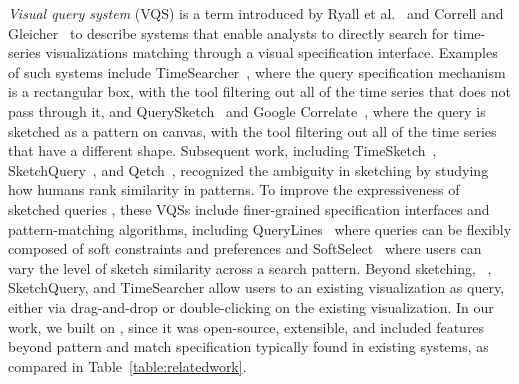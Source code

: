 {  \npar \emph{Visual query system} (VQS) is a term introduced by Ryall et al.~\cite{ryall2005querylines} and Correll and Gleicher~\cite{correll2016semantics} to describe systems that enable analysts to directly search for time-series visualizations matching  through a visual specification interface. Examples of such systems include TimeSearcher~\cite{Hochheiser2001,Hochheiser2004}, where the query specification mechanism is a rectangular box, with the tool filtering out all of the time series that does not pass through it, and QuerySketch~\cite{wattenberg2001sketching} and Google Correlate~\cite{mohebbi2011google}, where the query is sketched as a pattern on canvas, with the tool filtering out all of the time series that have a different shape. Subsequent work, including TimeSketch~\cite{Eichmann2015}, SketchQuery~\cite{correll2016semantics}, and Qetch~\cite{Mannino2018}, recognized the ambiguity in sketching by studying how humans rank similarity in patterns. To improve the expressiveness of sketched queries , these VQSs include finer-grained specification interfaces and pattern-matching algorithms, including QueryLines~\cite{ryall2005querylines} where queries can be flexibly composed of soft constraints and preferences and SoftSelect~\cite{Holz2009} where users can vary the level of sketch similarity across a search pattern. Beyond sketching, \zv~\cite{Siddiqui2017,Siddiqui2017VLDB}, SketchQuery, and TimeSearcher allow users to  an existing visualization as  query, either via drag-and-drop or double-clicking on the existing visualization. In our work, we built on \zv, since it was open-source, extensible, and included features beyond pattern and match specification typically found in existing systems, as compared in Table~\ref{table:relatedwork}. 
}
